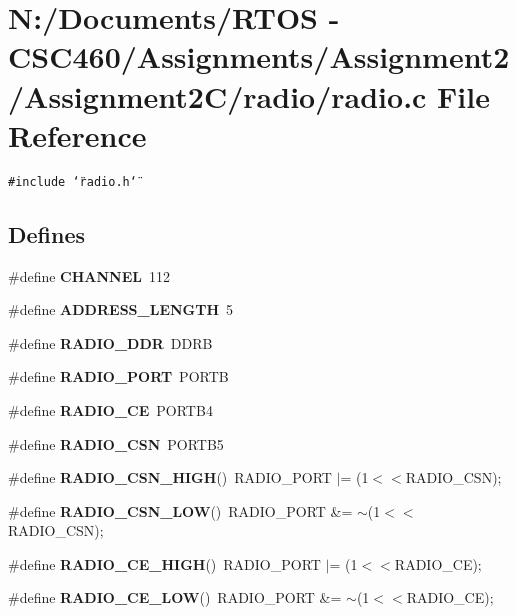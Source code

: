 \section{N:/Documents/RTOS - CSC460/Assignments/Assignment2/Assignment2C/radio/radio.c File Reference}
\label{radio_8c}
{\tt \#include \char`\"{}radio.h\char`\"{}}\par
\subsection*{Defines}
\begin{CompactItemize}
\item 
\#define {\bf CHANNEL}~112
\item 
\#define {\bf ADDRESS\_\-LENGTH}~5
\item 
\#define {\bf RADIO\_\-DDR}~DDRB
\item 
\#define {\bf RADIO\_\-PORT}~PORTB
\item 
\#define {\bf RADIO\_\-CE}~PORTB4
\item 
\#define {\bf RADIO\_\-CSN}~PORTB5
\item 
\#define {\bf RADIO\_\-CSN\_\-HIGH}()~RADIO\_\-PORT $|$=  (1$<$$<$RADIO\_\-CSN);
\item 
\#define {\bf RADIO\_\-CSN\_\-LOW}()~RADIO\_\-PORT \&= $\sim$(1$<$$<$RADIO\_\-CSN);
\item 
\#define {\bf RADIO\_\-CE\_\-HIGH}()~RADIO\_\-PORT $|$=  (1$<$$<$RADIO\_\-CE);
\item 
\#define {\bf RADIO\_\-CE\_\-LOW}()~RADIO\_\-PORT \&= $\sim$(1$<$$<$RADIO\_\-CE);
\end{CompactItemize}
